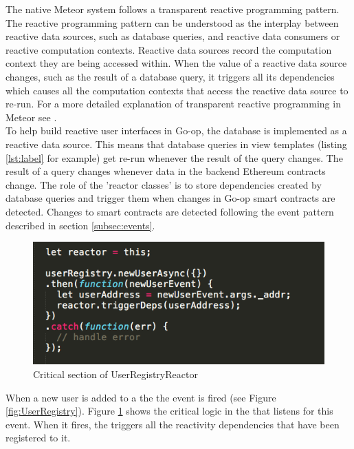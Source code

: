 The native Meteor system follows a transparent reactive programming pattern. The reactive programming pattern can be understood as the interplay between reactive data sources, such as database queries, and reactive data consumers or reactive computation contexts. Reactive data sources record the computation context they are being accessed within. When the value of a reactive data source changes, such as the result of a database query, it triggers all its dependencies which causes all the computation contexts that access the reactive data source to re-run. For a more detailed explanation of transparent reactive programming in Meteor see \cite{Tracker}.\\

To help build reactive user interfaces in Go-op, the database is implemented as a reactive data source. This means that database queries in view templates (listing \ref{lst:label} for example) get re-run whenever the result of the query changes. The result of a query changes whenever data in the backend Ethereum contracts change. The role of the 'reactor classes' is to store dependencies created by database queries and trigger them when changes in Go-op smart contracts are detected. Changes to smart contracts are detected following the event pattern described in section \ref{subsec:events}. \\

\begin{figure}
\centering
\includegraphics[width=\textwidth]{Figures/UserRegistryReactor}
\decoRule
\caption[]{Critical section of UserRegistryReactor}
\label{fig:UserRegistryReactor}
\end{figure}

When a new user is added to a the  the  event is fired (see Figure \ref{fig:UserRegistry}). Figure \ref{fig:UserRegistryReactor} shows the critical logic in the  that listens for this event. When it fires, the  triggers all the reactivity dependencies that have been registered to it. \\

